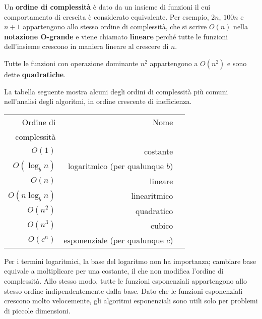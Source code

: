 \documentclass[10pt]{book}
\begin{document}
Un {\bf ordine di complessità} è dato da un insieme di funzioni il cui comportamento di crescita è considerato equivalente.  Per esempio, $2n$, $100n$ e $n+1$ appartengono allo stesso ordine di complessità, che si scrive $O(n)$ nella {\bf notazione O-grande} e viene chiamato {\bf lineare} perché tutte le funzioni dell'insieme crescono in maniera lineare al crescere di $n$.

Tutte le funzioni con operazione dominante $n^2$ appartengono a $O(n^2)$ e sono dette {\bf quadratiche}.

La tabella seguente mostra alcuni degli ordini di complessità più comuni nell'analisi degli algoritmi, in ordine crescente di inefficienza.

\begin{tabular}{|r|r|r|}
\hline
Ordine di     &   Nome      \\
complessità       &               \\
\hline
$O(1)$             & costante \\
$O(\log_b n)$      & logaritmico (per qualunque $b$) \\
$O(n)$             & lineare \\
$O(n \log_b n)$    & linearitmico \\
$O(n^2)$           & quadratico     \\
$O(n^3)$           & cubico     \\
$O(c^n)$           & esponenziale (per qualunque $c$)    \\
\hline
\end{tabular}

Per i termini logaritmici, la base del logaritmo non ha importanza; cambiare base equivale a moltiplicare per una costante, il che non modifica l'ordine di complessità. Allo stesso modo, tutte le funzioni esponenziali appartengono allo stesso ordine indipendentemente dalla base. Dato che le funzioni esponenziali crescono molto velocemente, gli algoritmi esponenziali sono utili solo per problemi di piccole dimensioni.
\end{document}
